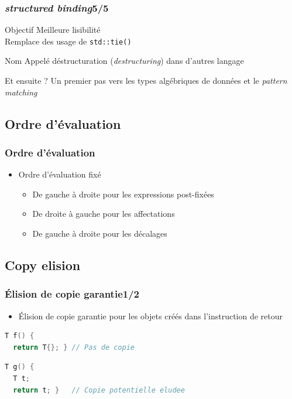 \documentclass[C++.tex]{subfiles}
\begin{document}
\begin{frame}[fragile]
	\frametitle{\textit{structured binding}\titlehfill{}5/5}
	\begin{block}{Objectif}
		Meilleure lisibilité\\
		Remplace des usage de \lstinline|std::tie()|
	\end{block}

	\begin{block}{Nom}
		Appelé déstructuration (\textit{destructuring}) dans d'autres langage
	\end{block}

	\begin{block}{Et ensuite ?}
		Un premier pas vers les types algébriques de données et le \textit{pattern matching}
	\end{block}

\end{frame}

\subsection*{Ordre d'évaluation}
\begin{frame}[fragile]
	\frametitle{Ordre d'évaluation}
	\begin{itemize}
		\item Ordre d'évaluation fixé
		\begin{itemize}
			\item De gauche à droite pour les expressions post-fixées


			\item De droite à gauche pour les affectations
			\item De gauche à droite pour les décalages
		\end{itemize}
	\end{itemize}
\end{frame}

\subsection*{Copy elision}
\begin{frame}[fragile]
	\frametitle{Élision de copie garantie\titlehfill{}1/2}
	\begin{itemize}
		\item Élision de copie garantie pour les objets créés dans l'instruction de retour
	\end{itemize}

	\begin{lstlisting}[language=C++]
T f() {
  return T{}; } // Pas de copie\end{lstlisting}

	\begin{lstlisting}[language=C++]
T g() {
  T t;
  return t; }   // Copie potentielle eludee\end{lstlisting}
\end{frame}
\end{document}
